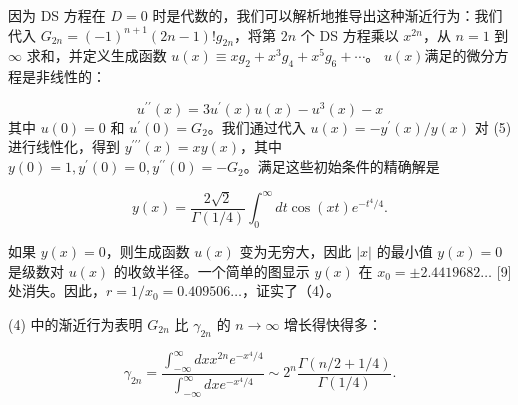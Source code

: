 \documentclass[UTF8]{article}
\begin{document}
因为 DS 方程在 \( D=0 \) 时是代数的，我们可以解析地推导出这种渐近行为：我们代入 \( G_{2 n}=(-1)^{n+1}(2 n-1) ! g_{2 n} \)，将第 \( 2 n \) 个 DS 方程乘以 \( x^{2 n} \)，从 \( n=1 \) 到 \( \infty \) 求和，并定义生成函数 \( u(x) \equiv x g_{2}+x^{3} g_{4}+x^{5} g_{6}+\cdots \)。 \( u(x) \)满足的微分方程是非线性的：




\[u^{\prime \prime}(x)=3 u^{\prime}(x) u(x)-u^{3}(x)-x
\] 其中 \( u(0)=0 \) 和 \( u^{\prime}(0)=G_{2} \)。我们通过代入 \( u(x)=-y^{\prime}(x) / y(x) \) 对 (5) 进行线性化，得到 \( y^{\prime \prime \prime}(x)=x y(x) \)，其中 \( y(0)=1, y^{\prime}(0)=0, y^{\prime \prime}(0)=-G_{2} \)。满足这些初始条件的精确解是




\[y(x)=\frac{2 \sqrt{2}}{\Gamma(1 / 4)} \int_{0}^{\infty} d t \cos (x t) e^{-t^{4} / 4} .
\]


如果 \( y(x)=0 \)，则生成函数 \( u(x) \) 变为无穷大，因此 \( |x| \) 的最小值 \( y(x)=0 \) 是级数对 \( u(x) \) 的收敛半径。一个简单的图显示 \( y(x) \) 在 \( x_{0}= \pm 2.4419682 \ldots \) [9] 处消失。因此，\( r=1 / x_{0}=0.409506 \ldots \)，证实了（4）。



(4) 中的渐近行为表明 \( G_{2 n} \) 比 \( \gamma_{2 n} \) 的 \( n \rightarrow \infty \) 增长得快得多：


\[
\gamma_{2 n}=\frac{\int_{-\infty}^{\infty} d x x^{2 n} e^{-x^{4} / 4}}{\int_{-\infty}^{\infty} d x e^{-x^{4} / 4}} \sim 2^{n} \frac{\Gamma(n / 2+1 / 4)}{\Gamma(1 / 4)} .
\]
\end{document}
